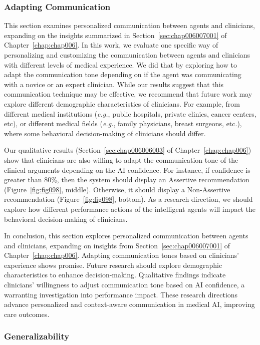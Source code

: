 \subsubsection{Adapting Communication}
\label{sec:app005008001003}

This section examines personalized communication between agents and clinicians, expanding on the insights summarized in Section~\ref{sec:chap006007001} of Chapter~\ref{chap:chap006}.
In this work, we evaluate one specific way of personalizing and customizing the communication between agents and clinicians with different levels of medical experience.
We did that by exploring how to adapt the communication tone depending on if the agent was communicating with a novice or an expert clinician.
While our results suggest that this communication technique may be effective, we recommend that future work may explore different demographic characteristics of clinicians.
For example, from different medical institutions ({\it e.g.}, public hospitals, private clinics, cancer centers, etc), or different medical fields ({\it e.g.}, family physicians, breast surgeons, etc.), where some behavioral decision-making of clinicians should differ.

Our qualitative results (Section~\ref{sec:chap006006003} of Chapter~\ref{chap:chap006}) show that clinicians are also willing to adapt the communication tone of the clinical arguments depending on the \ac{AI} confidence.
For instance, if confidence is greater than 80\%, then the system should display an Assertive recommendation (Figure~\ref{fig:fig098}, middle).
Otherwise, it should display a Non-Assertive recommendation (Figure~\ref{fig:fig098}, bottom).
As a research direction, we should explore how different performance actions of the intelligent agents will impact the behavioral decision-making of clinicians.

In conclusion, this section explores personalized communication between agents and clinicians, expanding on insights from Section~\ref{sec:chap006007001} of Chapter~\ref{chap:chap006}.
Adapting communication tones based on clinicians' experience shows promise.
Future research should explore demographic characteristics to enhance decision-making.
Qualitative findings indicate clinicians' willingness to adjust communication tone based on \ac{AI} confidence, a warranting investigation into performance impact.
These research directions advance personalized and context-aware communication in medical \ac{AI}, improving care outcomes.

\subsubsection{Generalizability}
\label{sec:app005008001004}

